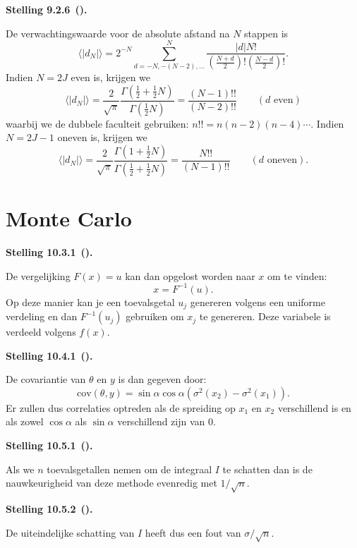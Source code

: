\documentclass[10pt,a4paper]{article}
\newenvironment{res}[3][]{%
  \begin{tcolorbox}[
    breakable,          %
    colback=gray!10,    %
    colframe=gray!40,   %
    boxrule=0.5pt,      %
    left=6pt, right=6pt, top=6pt, bottom=6pt %
  ]
  \noindent\textbf{#2 #3}\if\relax\detokenize{#1}\relax\else\ \textbf{(#1)}\fi\textbf{.}~\ignorespaces
}{%
  \end{tcolorbox}
}
\begin{document}
\begin{res}{Stelling}{9.2.6}
De verwachtingswaarde voor de absolute afstand na $N$ stappen is
\[
\langle |d_N|\rangle = 2^{-N} \sum_{d=-N,-(N-2),\dots}^N \frac{|d|N!}{\left(\frac{N+d}{2}\right)!\left(\frac{N-d}{2}\right)!}.
\]
Indien $N=2J$ even is, krijgen we
\[
\langle |d_N|\rangle = \frac{2}{\sqrt\pi}\frac{\Gamma(\frac12+\frac12 N)}{\Gamma(\frac12 N)} = \frac{(N-1)!!}{(N-2)!!} \qquad (d\text{ even})
\]
waarbij we de dubbele faculteit gebruiken: $n!! = n(n-2)(n-4)\cdots$. Indien $N=2J-1$ oneven is, krijgen we
\[
\langle |d_N|\rangle = \frac{2}{\sqrt\pi}\frac{\Gamma(1+\frac12 N)}{\Gamma(\frac12+\frac12 N)} = \frac{N!!}{(N-1)!!} \qquad (d\text{ oneven}).
\]
\end{res}

\section{Monte Carlo}

\begin{res}{Stelling}{10.3.1}
De vergelijking $F(x)=u$ kan dan opgelost worden naar $x$ om te vinden:
\[
x = F^{-1}(u).
\]
Op deze manier kan je een toevalsgetal $u_j$ genereren volgens een uniforme verdeling en dan $F^{-1}(u_j)$ gebruiken om $x_j$ te genereren. Deze variabele is verdeeld volgens $f(x)$.
\end{res}

\begin{res}{Stelling}{10.4.1}
De covariantie van $\theta$ en $y$ is dan gegeven door:
\[
\mathrm{cov}(\theta,y) = \sin\alpha\cos\alpha\left(\sigma^2(x_2)-\sigma^2(x_1)\right).
\]
Er zullen dus correlaties optreden als de spreiding op $x_1$ en $x_2$ verschillend is en als zowel $\cos\alpha$ als $\sin\alpha$ verschillend zijn van 0.
\end{res}

\begin{res}{Stelling}{10.5.1}
Als we $n$ toevalsgetallen nemen om de integraal $I$ te schatten dan is de nauwkeurigheid van deze methode evenredig met $1/\sqrt n$.
\end{res}

\begin{res}{Stelling}{10.5.2}
De uiteindelijke schatting van $I$ heeft dus een fout van $\sigma/\sqrt n$.
\end{res}
\end{document}
